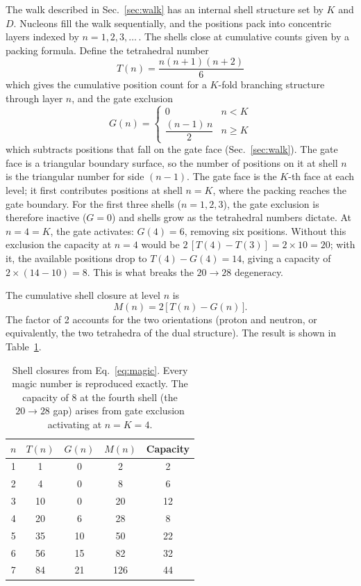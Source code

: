 \documentclass[fleqn,usenatbib]{mnras}
\begin{document}
The walk described in Sec.~\ref{sec:walk} has an internal shell structure set by $K$ and $D$. Nucleons fill the walk sequentially, and the positions pack into concentric layers indexed by $n = 1, 2, 3, \ldots$\,. The shells close at cumulative counts given by a packing formula. Define the tetrahedral number
\begin{equation}
T(n) = \frac{n(n+1)(n+2)}{6}
\end{equation}
which gives the cumulative position count for a $K$-fold branching structure through layer $n$, and the gate exclusion
\begin{equation}
G(n) = \begin{cases} 0 & n < K \\ \dfrac{(n-1)\,n}{2} & n \geq K \end{cases}
\end{equation}
which subtracts positions that fall on the gate face (Sec.~\ref{sec:walk}). The gate face is a triangular boundary surface, so the number of positions on it at shell $n$ is the triangular number for side $(n-1)$. The gate face is the $K$-th face at each level; it first contributes positions at shell $n = K$, where the packing reaches the gate boundary. For the first three shells ($n = 1, 2, 3$), the gate exclusion is therefore inactive ($G = 0$) and shells grow as the tetrahedral numbers dictate. At $n = 4 = K$, the gate activates: $G(4) = 6$, removing six positions. Without this exclusion the capacity at $n = 4$ would be $2\,[T(4) - T(3)] = 2 \times 10 = 20$; with it, the available positions drop to $T(4) - G(4) = 14$, giving a capacity of $2 \times (14 - 10) = 8$. This is what breaks the $20\!\to\!28$ degeneracy.

The cumulative shell closure at level $n$ is
\begin{equation}
M(n) = 2\,\big[\,T(n) - G(n)\,\big].
\label{eq:magic}
\end{equation}
The factor of 2 accounts for the two orientations (proton and neutron, or equivalently, the two tetrahedra of the dual structure). The result is shown in Table~\ref{tab:magic}.

\begin{table}
\centering
\caption{Shell closures from Eq.~\ref{eq:magic}. Every magic number is reproduced exactly. The capacity of 8 at the fourth shell (the $20\!\to\!28$ gap) arises from gate exclusion activating at $n = K = 4$.}
\label{tab:magic}
\begin{tabular}{ccccc}
\hline
$n$ & $T(n)$ & $G(n)$ & $M(n)$ & Capacity \\
\hline
1 &  1 & 0 &   2 &  2 \\
2 &  4 & 0 &   8 &  6 \\
3 & 10 & 0 &  20 & 12 \\
4 & 20 & 6 &  28 &  8 \\
5 & 35 & 10 &  50 & 22 \\
6 & 56 & 15 &  82 & 32 \\
7 & 84 & 21 & 126 & 44 \\
\hline
\end{tabular}
\end{table}
\end{document}

